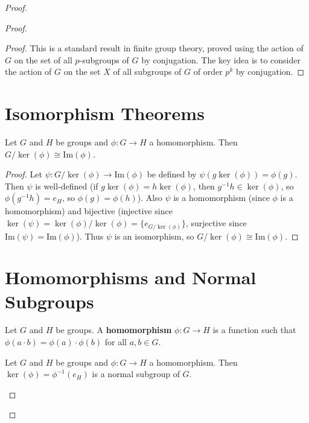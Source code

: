 \begin{proof}
\begin{proof}
\begin{proof}
This is a standard result in finite group theory, proved using the action of $G$ on the set of all $p$-subgroups of $G$ by conjugation. The key idea is to consider the action of $G$ on the set $X$ of all subgroups of $G$ of order $p^k$ by conjugation.
\end{proof}

\section{Isomorphism Theorems}
\label{sec:isomorphism-theorems}

\begin{theorem}
\label{thm:first-isomorphism}
Let $G$ and $H$ be groups and $\phi: G \to H$ a homomorphism. Then $G/\ker(\phi) \cong \text{Im}(\phi)$.
\end{theorem}

\begin{proof}
Let $\psi: G/\ker(\phi) \to \text{Im}(\phi)$ be defined by $\psi(g\ker(\phi)) = \phi(g)$.
Then $\psi$ is well-defined (if $g\ker(\phi) = h\ker(\phi)$, then $g^{-1}h \in \ker(\phi)$, so $\phi(g^{-1}h) = e_H$, so $\phi(g) = \phi(h)$).
Also $\psi$ is a homomorphism (since $\phi$ is a homomorphism) and bijective (injective since $\ker(\psi) = \ker(\phi)/\ker(\phi) = \{e_{G/\ker(\phi)}\}$, surjective since $\text{Im}(\psi) = \text{Im}(\phi)$).
Thus $\psi$ is an isomorphism, so $G/\ker(\phi) \cong \text{Im}(\phi)$.
\end{proof}

\section{Homomorphisms and Normal Subgroups}
\label{sec:homomorphisms-normal}

\begin{definition}[Homomorphism]
\label{def:homomorphism}
Let $G$ and $H$ be groups. A \textbf{homomorphism} $\phi: G \to H$ is a function such that $\phi(a \cdot b) = \phi(a) \cdot \phi(b)$ for all $a, b \in G$.
\end{definition}

\begin{theorem}
\label{thm:kernel-homomorphism}
Let $G$ and $H$ be groups and $\phi: G \to H$ a homomorphism. Then $\ker(\phi) = \phi^{-1}(e_H)$ is a normal subgroup of $G$.
\end{theorem}


\end{proof}
\end{proof}
